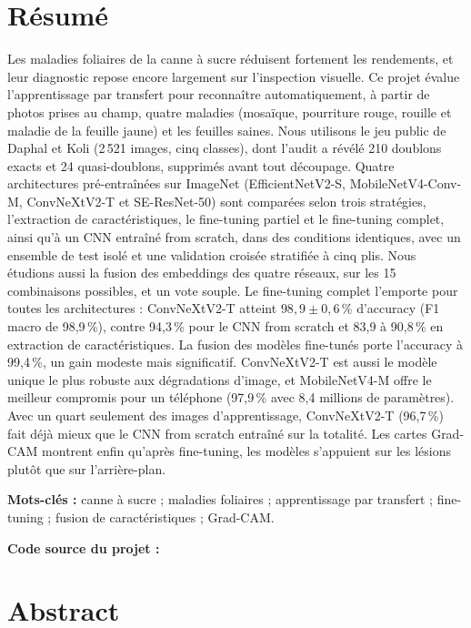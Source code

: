 \section*{Résumé}

Les maladies foliaires de la canne à sucre réduisent fortement les rendements, et leur diagnostic repose encore largement sur l'inspection visuelle. Ce projet évalue l'apprentissage par transfert pour reconnaître automatiquement, à partir de photos prises au champ, quatre maladies (mosaïque, pourriture rouge, rouille et maladie de la feuille jaune) et les feuilles saines. Nous utilisons le jeu public de Daphal et Koli (2\,521 images, cinq classes), dont l'audit a révélé 210 doublons exacts et 24 quasi-doublons, supprimés avant tout découpage. Quatre architectures pré-entraînées sur ImageNet (EfficientNetV2-S, MobileNetV4-Conv-M, ConvNeXtV2-T et SE-ResNet-50) sont comparées selon trois stratégies, l'extraction de caractéristiques, le fine-tuning partiel et le fine-tuning complet, ainsi qu'à un CNN entraîné from scratch, dans des conditions identiques, avec un ensemble de test isolé et une validation croisée stratifiée à cinq plis. Nous étudions aussi la fusion des embeddings des quatre réseaux, sur les 15 combinaisons possibles, et un vote souple. Le fine-tuning complet l'emporte pour toutes les architectures : ConvNeXtV2-T atteint $98{,}9 \pm 0{,}6$\,\% d'accuracy (F1 macro de 98,9\,\%), contre 94,3\,\% pour le CNN from scratch et 83,9 à 90,8\,\% en extraction de caractéristiques. La fusion des modèles fine-tunés porte l'accuracy à 99,4\,\%, un gain modeste mais significatif. ConvNeXtV2-T est aussi le modèle unique le plus robuste aux dégradations d'image, et MobileNetV4-M offre le meilleur compromis pour un téléphone (97,9\,\% avec 8,4 millions de paramètres). Avec un quart seulement des images d'apprentissage, ConvNeXtV2-T (96,7\,\%) fait déjà mieux que le CNN from scratch entraîné sur la totalité. Les cartes Grad-CAM montrent enfin qu'après fine-tuning, les modèles s'appuient sur les lésions plutôt que sur l'arrière-plan.

\medskip
\noindent\textbf{Mots-clés :} canne à sucre ; maladies foliaires ; apprentissage par transfert ; fine-tuning ; fusion de caractéristiques ; Grad-CAM.

\medskip
\noindent\textbf{Code source du projet :} \depot

\section*{Abstract}

